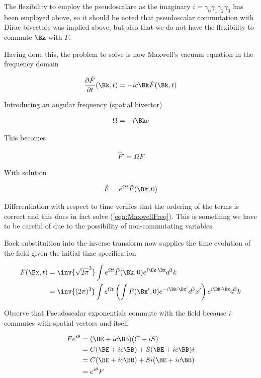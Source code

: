 \documentclass[]{eliblog}
\begin{document}
The flexibility to employ the pseudoscalare as the imaginary $i = \gamma_0 \gamma_1 \gamma_2 \gamma_3$ has been employed above, so it should
be noted that pseudoscalar commutation with Dirac bivectors was implied above, but also that we do not have the flexibility to commute $\Bk$ with $F$.

Having done this, the problem to solve is now Maxwell's vacuum equation in the frequency domain

\begin{align*}
\PD{t}{\hat{F}}(\Bk,t) = -i c \Bk \hat{F}(\Bk,t)
\end{align*}

Introducing an angular frequency (spatial bivector)

\begin{align*}
\Omega = -i \Bk c
\end{align*}

This becomes

\begin{align}\label{eqn:MaxwellFreq}
\hat{F}' = \Omega F
\end{align}

With solution

\begin{align}
\hat{F} = e^{\Omega t} \hat{F}(\Bk,0)
\end{align}

Differentiation with respect to time verifies that the ordering of the terms is correct and this does in fact solve (\ref{eqn:MaxwellFreq}).  This
is something we have to be careful of due to the possibility of non-commutating variables.

Back substituition into the inverse transform now supplies the time evolution of the field given the initial time specification

\begin{align*}
F(\Bx,t) 
&= \inv{\sqrt{2\pi}^3} \int e^{\Omega t} \hat{F}(\Bk,0) e^{i \Bk \cdot \Bx} d^3 k \\
&= \inv{(2\pi)^3} \int e^{\Omega t} \left( \int {F}(\Bx',0) e^{-i \Bk \cdot \Bx'} d^3 x' \right) e^{i \Bk \cdot \Bx} d^3 k
\end{align*}

Observe that Pseudoscalar exponentials commute with the field because $i$ commutes with spatial vectors and itself

\begin{align*}
F e^{i\theta} 
&= (\BE + i c \BB) (C + iS) \\
&= 
C (\BE + i c \BB) 
+ S (\BE + i c \BB) i  \\
&= 
C (\BE + i c \BB) 
+ S i (\BE + i c \BB) \\
&= 
e^{i\theta} F
\end{align*}
\end{document}
